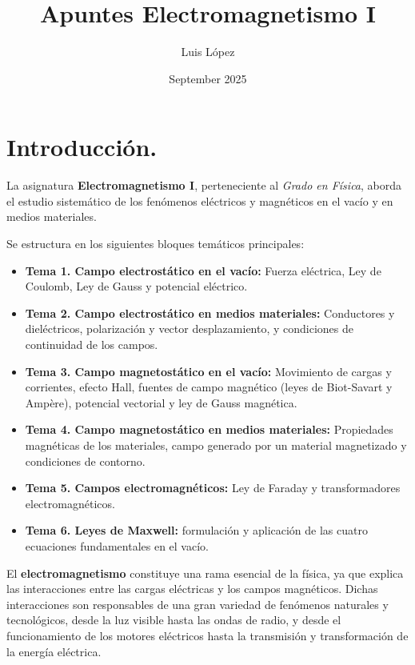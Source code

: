 \documentclass[a4paper,12pt]{article}
\title{Apuntes Electromagnetismo I}
\author{Luis López}
\date{September 2025}
\begin{document}
\maketitle %

\newpage 

\tableofcontents %
\newpage 

\section*{Introducción.}

La asignatura \textbf{Electromagnetismo I}, perteneciente al \textit{Grado en Física}, aborda el estudio sistemático de los fenómenos eléctricos y magnéticos en el vacío y en medios materiales.  

Se estructura en los siguientes bloques temáticos principales:

\begin{itemize}
    \item \textbf{Tema 1. Campo electrostático en el vacío:} Fuerza eléctrica, Ley de Coulomb, Ley de Gauss y potencial eléctrico. 
    \item \textbf{Tema 2. Campo electrostático en medios materiales:} Conductores y dieléctricos, polarización y vector desplazamiento, y condiciones de continuidad de los campos.
    \item \textbf{Tema 3. Campo magnetostático en el vacío:} Movimiento de cargas y corrientes, efecto Hall, fuentes de campo magnético (leyes de Biot-Savart y Ampère), potencial vectorial y ley de Gauss magnética.
    \item \textbf{Tema 4. Campo magnetostático en medios materiales:} Propiedades magnéticas de los materiales, campo generado por un material magnetizado y condiciones de contorno.
    \item \textbf{Tema 5. Campos electromagnéticos:} Ley de Faraday y transformadores electromagnéticos.
    \item \textbf{Tema 6. Leyes de Maxwell:} formulación y aplicación de las cuatro ecuaciones fundamentales en el vacío.
\end{itemize}

\medskip
\noindent
El \textbf{electromagnetismo} constituye una rama esencial de la física, ya que explica las interacciones entre las cargas eléctricas y los campos magnéticos. Dichas interacciones son responsables de una gran variedad de fenómenos naturales y tecnológicos, desde la luz visible hasta las ondas de radio, y desde el funcionamiento de los motores eléctricos hasta la transmisión y transformación de la energía eléctrica.\\ 
\end{document}
